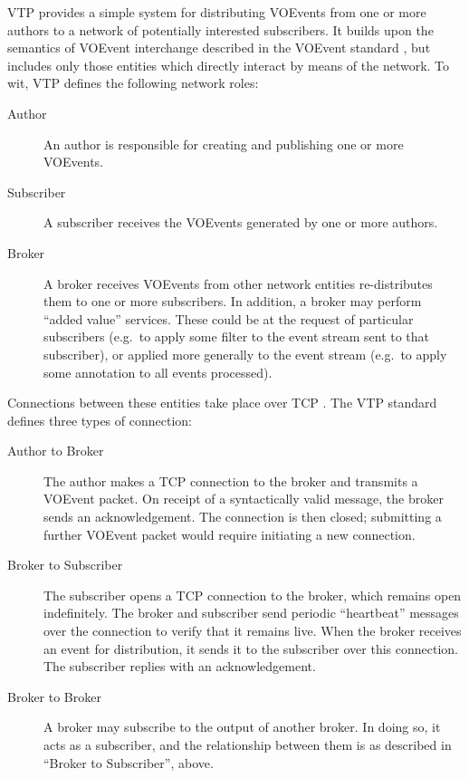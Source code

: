 \documentclass[5p,authoryear]{elsarticle}
\begin{document}
VTP provides a simple system for distributing VOEvents from one or more
authors to a network of potentially interested subscribers. It builds upon the
semantics of VOEvent interchange described in the VOEvent standard
\citep{Seaman:2011}, but includes only those entities which directly interact
by means of the network. To wit, VTP defines the following network roles:

\begin{description}

  \item[Author]{An author is responsible for creating and publishing one or
  more VOEvents.}

  \item[Subscriber]{A subscriber receives the VOEvents generated by one or
  more authors.}

  \item[Broker]{A broker receives VOEvents from other network entities
  re-distributes them to one or more subscribers. In addition, a broker may
  perform ``added value'' services. These could be at the request of
  particular subscribers (e.g.\ to apply some filter to the event stream sent
  to that subscriber), or applied more generally to the event stream (e.g.\ to
  apply some annotation to all events processed).}

\end{description}

Connections between these entities take place over TCP \citep{Cerf:1974}. The
VTP standard defines three types of connection:

\begin{description}

  \item[Author to Broker]{The author makes a TCP connection to the broker and
  transmits a VOEvent packet. On receipt of a syntactically valid message, the
  broker sends an acknowledgement.  The connection is then closed; submitting
  a further VOEvent packet would require initiating a new connection.}

  \item[Broker to Subscriber]{The subscriber opens a TCP connection to the
  broker, which remains open indefinitely. The broker and subscriber send
  periodic ``heartbeat'' messages over the connection to verify that it
  remains live.  When the broker receives an event for distribution, it sends
  it to the subscriber over this connection. The subscriber replies with an
  acknowledgement.}

  \item[Broker to Broker]{A broker may subscribe to the output of another
  broker. In doing so, it acts as a subscriber, and the relationship between
  them is as described in ``Broker to Subscriber'', above.}

\end{description}
\end{document}
